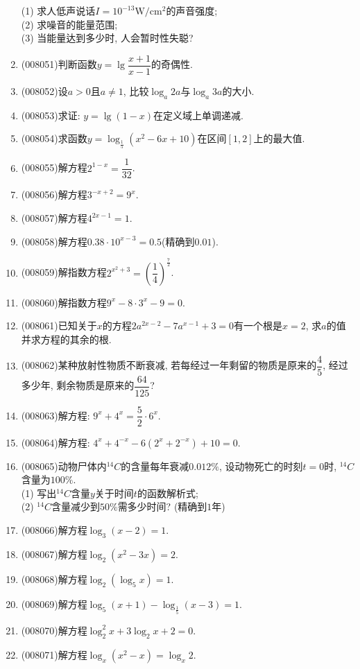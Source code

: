 \documentclass[10pt,a4paper]{article}
\begin{document}
\begin{enumerate}[1.]
(1) 求人低声说话$I=10^{-13}\text{W}/\text{cm}^2$的声音强度;\\
(2) 求噪音的能量范围;\\
(3) 当能量达到多少时, 人会暂时性失聪?
\item {\tiny (008051)}判断函数$y=\lg\dfrac{x+1}{x-1}$的奇偶性.
\item {\tiny (008052)}设$a>0$且$a\ne 1$, 比较$\log _a2a$与$\log _a3a$的大小.
\item {\tiny (008053)}求证: $y=\lg(1-x)$在定义域上单调递减.
\item {\tiny (008054)}求函数$y=\log _{\frac 15}(x^2-6x+10)$在区间$[1,2]$上的最大值.
\item {\tiny (008055)}解方程$2^{1-x}=\dfrac 1{32}$.
\item {\tiny (008056)}解方程$3^{-x+2}=9^x$.
\item {\tiny (008057)}解方程$4^{2x-1}=1$.
\item {\tiny (008058)}解方程$0.38\cdot 10^{x-3}=0.5$(精确到$0.01$).
\item {\tiny (008059)}解指数方程$2^{x^2+3}=(\dfrac 14)^{\frac 72}$.
\item {\tiny (008060)}解指数方程$9^x-8\cdot 3^x-9=0$.
\item {\tiny (008061)}已知关于$x$的方程$2a^{2x-2}-7a^{x-1}+3=0$有一个根是$x=2$, 求$a$的值并求方程的其余的根.
\item {\tiny (008062)}某种放射性物质不断衰减, 若每经过一年剩留的物质是原来的$\dfrac 45$, 经过多少年, 剩余物质是原来的$\dfrac{64}{125}$?
\item {\tiny (008063)}解方程: $9^x+4^x=\dfrac 52\cdot 6^x$.
\item {\tiny (008064)}解方程: $4^x+4^{-x}-6(2^x+2^{-x})+10=0$.
\item {\tiny (008065)}动物尸体内$^{14}C$的含量每年衰减$0.012\%$, 设动物死亡的时刻$t=0$时, $^{14}C$含量为$100\%$.\\
(1) 写出$^{14}C$含量$y$关于时间$t$的函数解析式;\\
(2) $^{14}C$含量减少到$50\%$需多少时间? (精确到$1$年)
\item {\tiny (008066)}解方程$\log _3(x-2)=1$.
\item {\tiny (008067)}解方程$\log _2(x^2-3x)=2$.
\item {\tiny (008068)}解方程$\log _2(\log _5x)=1$.
\item {\tiny (008069)}解方程$\log _5(x+1)-\log _{\frac 15}(x-3)=1$.
\item {\tiny (008070)}解方程$\log _2^2x+3\log _2x+2=0$.
\item {\tiny (008071)}解方程$\log _x(x^2-x)=\log _x2$.

\end{enumerate}
\end{document}
